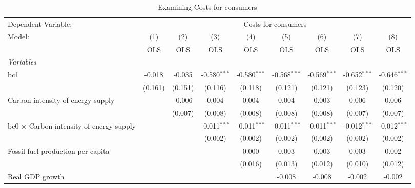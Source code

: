 
\begin{table}[htbp]
   \caption{Examining Costs for consumers}
   \centering
   \begin{tabular}{lcccccccc}
      \toprule
      Dependent Variable: & \multicolumn{8}{c}{Costs for consumers}\\
      Model:                                          & (1)     & (2)     & (3)            & (4)            & (5)            & (6)            & (7)            & (8)\\  
                                                      &  OLS    & OLS     & OLS            & OLS            & OLS            & OLS            & OLS            & OLS\\  
      \midrule
      \emph{Variables}\\
      bc1                                             & -0.018  & -0.035  & -0.580$^{***}$ & -0.580$^{***}$ & -0.568$^{***}$ & -0.569$^{***}$ & -0.652$^{***}$ & -0.646$^{***}$\\   
                                                      & (0.161) & (0.151) & (0.116)        & (0.118)        & (0.121)        & (0.121)        & (0.123)        & (0.120)\\   
      Carbon intensity of energy supply               &         & -0.006  & 0.004          & 0.004          & 0.004          & 0.003          & 0.006          & 0.006\\   
                                                      &         & (0.007) & (0.008)        & (0.008)        & (0.008)        & (0.008)        & (0.007)        & (0.007)\\   
      bc0 $\times$ Carbon intensity of energy supply  &         &         & -0.011$^{***}$ & -0.011$^{***}$ & -0.011$^{***}$ & -0.011$^{***}$ & -0.012$^{***}$ & -0.012$^{***}$\\   
                                                      &         &         & (0.002)        & (0.002)        & (0.002)        & (0.002)        & (0.002)        & (0.002)\\   
      Fossil fuel production per capita               &         &         &                & 0.000          & 0.003          & 0.003          & 0.003          & 0.002\\   
                                                      &         &         &                & (0.016)        & (0.013)        & (0.012)        & (0.010)        & (0.012)\\   
      Real GDP growth                                 &         &         &                &                & -0.008         & -0.008         & -0.002         & -0.002\\   

\end{tabular}
\end{table}
